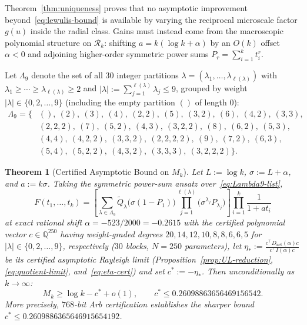 \documentclass[11pt, reqno]{amsart}
\newtheorem{theorem}{Theorem}
\theoremstyle{remark}
\numberwithin{equation}{section}
\newcommand{\cR}{\mathcal{R}}
\begin{document}
Theorem~\ref{thm:uniqueness} proves that no asymptotic improvement beyond~\eqref{eq:lewulis-bound}
is available by varying the reciprocal microscale factor $g(u)$ inside the radial class.
Gains must instead come from the macroscopic polynomial structure on $\cR_k$: shifting $a = k(\log k + \alpha)$
by an $O(k)$ offset $\alpha < 0$ and adjoining higher-order symmetric power sums $P_r = \sum_{i=1}^k t_i^r$.

Let $\Lambda_9$ denote the set of all $30$ integer partitions $\lambda = (\lambda_1, \dots, \lambda_{\ell(\lambda)})$
with $\lambda_1 \ge \cdots \ge \lambda_{\ell(\lambda)} \ge 2$ and $|\lambda| := \sum_{j=1}^{\ell(\lambda)} \lambda_j \le 9$,
grouped by weight $|\lambda| \in \{0, 2, \dots, 9\}$ (including the empty partition $()$ of length $0$):
\begin{equation}\label{eq:Lambda9-list}
\begin{aligned}
\Lambda_9 = \bigl\{ &(),\ (2),\ (3),\ (4),\ (2,2),\ (5),\ (3,2),\ (6),\ (4,2),\ (3,3),\\
&(2,2,2),\ (7),\ (5,2),\ (4,3),\ (3,2,2),\ (8),\ (6,2),\ (5,3),\\
&(4,4),\ (4,2,2),\ (3,3,2),\ (2,2,2,2),\ (9),\ (7,2),\ (6,3),\\
&(5,4),\ (5,2,2),\ (4,3,2),\ (3,3,3),\ (3,2,2,2)\bigr\}.
\end{aligned}
\end{equation}

\begin{theorem}[Certified Asymptotic Bound on $M_k$]\label{thm:main}
Let $L := \log k$, $\sigma := L + \alpha$, and $a := k\sigma$. Taking the symmetric
power-sum ansatz over~\eqref{eq:Lambda9-list},
\begin{equation}\label{eq:ansatz-C}
F(t_1,\dots,t_k) = \left[ \sum_{\lambda \in \Lambda_9}
\widetilde{Q}_\lambda\bigl(\sigma(1-P_1)\bigr)
\prod_{j=1}^{\ell(\lambda)} \bigl(\sigma^{\lambda_j} P_{\lambda_j}\bigr) \right]
\prod_{i=1}^k \frac{1}{1 + a t_i}
\end{equation}
at exact rational shift $\alpha = -523/2000 = -0.2615$ with the certified polynomial vector
$c \in \mathbb{Q}^{250}$ having weight-graded degrees $20, 14, 12, 10, 8, 8, 6, 6, 5$ for
$|\lambda| \in \{0, 2, \dots, 9\}$, respectively ($30$ blocks, $N = 250$ parameters), let
$\eta_* := \frac{c^\top D_{\mathrm{net}}(\alpha) c}{c^\top I(\alpha) c}$ be its certified asymptotic
Rayleigh limit (Proposition~\ref{prop:UL-reduction}, \eqref{eq:quotient-limit}, and~\eqref{eq:eta-cert})
and set $c^* := -\eta_*$. Then unconditionally as $k \to \infty$:
\begin{equation}\label{eq:main-bound}
M_k \ge \log k - c^* + o(1), \qquad c^* \le 0.26098863656469156542.
\end{equation}
More precisely, $768$-bit Arb certification establishes the sharper bound
$c^* \le 0.2609886365646915654192$.
\end{theorem}
\end{document}
